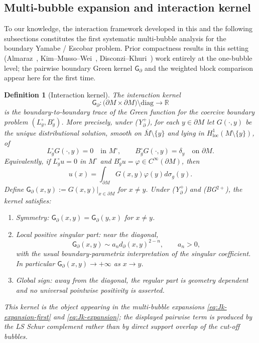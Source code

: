\documentclass[11pt,reqno,a4paper]{amsart}
\newcommand{\R}{\mathbb{R}}
\numberwithin{equation}{section}
\theoremstyle{plain}
\newtheorem{definition}[theorem]{Definition}
\theoremstyle{remark}
\theoremstyle{plain}
\begin{document}
\subsection{Multi-bubble expansion and interaction kernel}

To our knowledge, the interaction framework developed in this and the following subsections
constitutes the first systematic multi-bubble analysis for the boundary Yamabe / Escobar problem.
Prior compactness results in this setting (Almaraz~\cite{Almaraz2011CVPDE},
Kim--Musso--Wei~\cite{KimMussoWei2021}, Disconzi--Khuri~\cite{DisconziKhuri2017}) work entirely
at the one-bubble level; the pairwise boundary Green kernel $\mathsf G_\partial$ and the
weighted block comparison appear here for the first time.


\begin{definition}[Interaction kernel]\label{def:Gpartial}
The \emph{interaction kernel}
\[
\mathsf G_\partial:\big(\partial M\times\partial M\big)\setminus\mathrm{diag}\longrightarrow\R
\]
is the boundary-to-boundary trace of the Green function for the coercive boundary
problem $(L_g^\circ,B_g^\circ)$.  More precisely, under
\textup{(Y$^+_\partial$)}, for each $y\in\partial M$ let $G(\cdot,y)$ be the
unique distributional solution, smooth on $\overline M\setminus\{y\}$ and lying in
$H^1_{\mathrm{loc}}(M\setminus\{y\})$, of
\[
L_g^\circ G(\cdot,y)=0\quad\text{in }M^\circ,
\qquad
B_g^\circ G(\cdot,y)=\delta_y\quad\text{on }\partial M .
\]
Equivalently, if $L_g^\circ u=0$ in $M^\circ$ and
$B_g^\circ u=\varphi\in C^\infty(\partial M)$, then
\[
u(x)=\int_{\partial M}G(x,y)\varphi(y)d\sigma_g(y).
\]
Define
$\mathsf G_\partial(x,y):=G(x,y)|_{x\in\partial M}$ for $x\ne y$.
Under \textup{(Y$^+_\partial$)} and \textup{(BG$^{2+}$)}, the kernel satisfies:
\begin{enumerate}[label=\textup{(\roman*)},leftmargin=1.25em]
\item \emph{Symmetry:}
$\mathsf G_\partial(x,y)=\mathsf G_\partial(y,x)$ for $x\ne y$.
\item \emph{Local positive singular part:} near the diagonal,
\[
\mathsf G_\partial(x,y)\sim a_n d_\partial(x,y)^{2-n},
\qquad a_n>0,
\]
with the usual boundary-parametrix interpretation of the singular coefficient.
In particular $\mathsf G_\partial(x,y)\to+\infty$ as $x\to y$.
\item \emph{Global sign:} away from the diagonal, the regular part is geometry
dependent and no universal pointwise positivity is asserted.
\end{enumerate}
This kernel is the object appearing in the multi-bubble expansions
\eqref{eq:Jk-expansion-first} and \eqref{eq:Jk-expansion}; the displayed pairwise
term is produced by the LS Schur complement rather than by direct support overlap
of the cut-off bubbles.
\end{definition}
\end{document}
